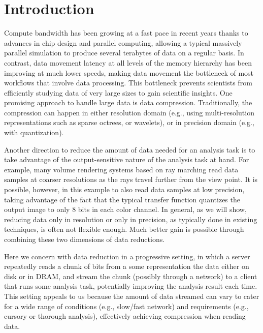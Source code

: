 \section{Introduction}

Compute bandwidth has been growing at a fast pace in recent years thanks to advances in chip design and parallel computing, allowing a typical massively parallel simulation to produce several terabytes of data on a regular basis. In contrast, data movement latency at all levels of the memory hierarchy has been improving at much lower speeds, making data movement the bottleneck of most workflows that involve data processing. This bottleneck prevents scientists from efficiently studying data of very large sizes to gain scientific insights. One promising approach to handle large data is data compression. Traditionally, the compression can happen in either resolution domain (e.g., using multi-resolution representations such as sparse octrees, or wavelets), or in precision domain (e.g., with quantization).

Another direction to reduce the amount of data needed for an analysis task is to take advantage of the output-sensitive nature of the analysis task at hand. For example, many volume rendering systems based on ray marching read data samples at coarser resolutions as the rays travel further from the view point. It is possible, however, in this example to also read data samples at low precision, taking advantage of the fact that the typical transfer function quantizes the output image to only 8 bits in each color channel. In general, as we will show, reducing data only in resolution or only in precision, as typically done in existing techniques, is often not flexible enough. Much better gain is possible through combining these two dimensions of data reductions. 

Here we concern with data reduction in a progressive setting, in which a server repeatedly reads a chunk of bits from a some representation the data either on disk or in DRAM, and stream the chunk (possibly through a network) to a client that runs some analysis task, potentially improving the analysis result each time. This setting appeals to us because the amount of data streamed can vary to cater for a wide range of conditions (e.g., slow/fast network) and requirements (e.g., cursory or thorough analysis), effectively achieving compression when reading data.

